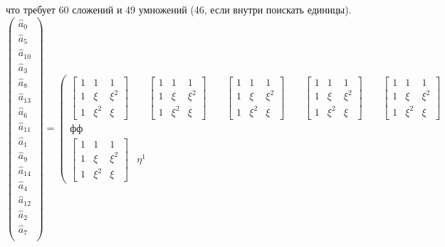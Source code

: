 \documentclass{mai_book}
\begin{document}
\noindent что требует 60 сложений и 49 умножений (46, если внутри поискать\linebreak
единицы).
{\tiny
$$
\left(\begin{array}{c}
  \hat{a}_0 \\
  \hat{a}_5 \\
\hat{a}_{10} \\
\hat{a}_3 \\
\hat{a}_8 \\
\hat{a}_{13} \\
\hat{a}_6 \\
\hat{a}_{11} \\
\hat{a}_1 \\
\hat{a}_9 \\
\hat{a}_{14} \\
\hat{a}_4 \\
\hat{a}_{12} \\
\hat{a}_2 \\
\hat{a}_7 \\
\end{array}\right)=
\left(\begin{array}{ccccc}
\begin{bmatrix}1 & 1 & 1 \\1 & \xi & \xi^2 \\ 1 & \xi^2 & \xi \end{bmatrix} &~~~~~
\begin{bmatrix}1 & 1 & 1 \\1 & \xi & \xi^2 \\ 1 & \xi^2 & \xi \end{bmatrix} &~~~~~
\begin{bmatrix}1 & 1 & 1 \\1 & \xi & \xi^2 \\ 1 & \xi^2 & \xi \end{bmatrix} &~~~~~
\begin{bmatrix}1 & 1 & 1 \\1 & \xi & \xi^2 \\ 1 & \xi^2 & \xi \end{bmatrix} &~~~~~
\begin{bmatrix}1 & 1 & 1 \\1 & \xi & \xi^2 \\ 1 & \xi^2 & \xi \end{bmatrix} \\
фф\\
\begin{bmatrix}1 & 1 & 1 \\1 & \xi & \xi^2 \\ 1 & \xi^2 & \xi \end{bmatrix} & \eta^1

\end{array}$$}
\end{document}

